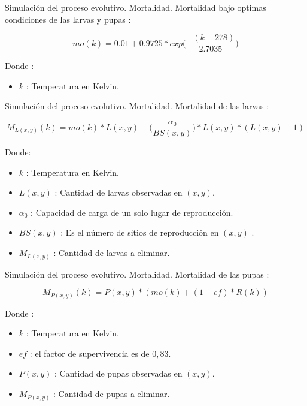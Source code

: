 \begin{frame}[c]{Simulación del proceso evolutivo. Mortalidad.}
  Mortalidad bajo optimas condiciones de las larvas y pupas :
  \begin{center}
    \begin{equation}
    \label{eq:mortalidad-natural-larvas}
        mo(k) = 0.01 + 0.9725 * exp\bigg( \frac{-(k - 278)}{2.7035}\bigg)
    \end{equation}
  \end{center}
  Donde :
    \begin{itemize}
      \item $k$ : Temperatura en Kelvin.
    \end{itemize}
\end{frame}

\begin{frame}[c]{Simulación del proceso evolutivo. Mortalidad.}
  Mortalidad de las larvas :
  \begin{center}
      \begin{equation}
      M_{L(x,y)}(k) = mo(k) * L(x,y) + \bigg(\frac{\alpha _{0}}{BS(x,y)}\bigg) * L(x,y) *(L(x,y) - 1)
    \end{equation}
  \end{center}
  Donde:
 \begin{itemize}
      \item $k$ : Temperatura en Kelvin.
      \item $L(x, y)$ : Cantidad de larvas observadas en $(x,y)$.
      \item $\alpha _{0}$ : Capacidad de carga de un solo lugar de reproducción.
      \item $BS(x,y)$ : Es el número de sitios de reproducción en $(x,y)$ .
      \item $M_{L(x,y)}$ : Cantidad de larvas a eliminar.
    \end{itemize}
\end{frame}

\begin{frame}[c]{Simulación del proceso evolutivo. Mortalidad.}
  Mortalidad de las pupas :
  \begin{center}
    \begin{equation}
        M_{P(x,y)}(k) = P(x,y) * (mo(k) + (1 - ef) * R(k))
    \end{equation}
  \end{center}
  Donde :
    \begin{itemize}
      \item $k$ : Temperatura en Kelvin.
      \item $ef$ : el factor de supervivencia es de $0,83$.
      \item $P(x, y)$ : Cantidad de pupas observadas en $(x,y)$.
      \item $M_{P(x,y)}$ : Cantidad de pupas a eliminar.
    \end{itemize}
\end{frame}

